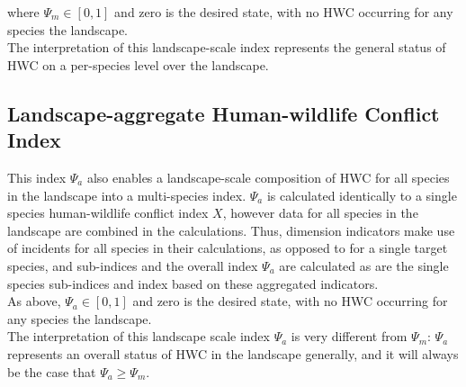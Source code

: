 \documentclass[fleqn,10pt]{olplainarticle}
\begin{document}
where $\Psi_m \in [0,1]$ and zero is the desired state, with no HWC occurring for any species the landscape.\\

The interpretation of this landscape-scale index represents the general status of HWC on a per-species level over the landscape.\\

\subsection*{Landscape-aggregate Human-wildlife Conflict Index}
This index $\Psi_a$ also enables a landscape-scale composition of HWC for all species in the landscape into a multi-species index. $\Psi_a$ is calculated identically to a single species human-wildlife conflict index $X$, however data for all species in the landscape are combined in the calculations. Thus, dimension indicators make use of incidents for all species in their calculations, as opposed to for a single target species, and sub-indices and the overall index $\Psi_a$ are calculated as are the single species sub-indices and index based on these aggregated indicators.\\

As above, $\Psi_a \in [0,1]$ and zero is the desired state, with no HWC occurring for any species the landscape. \\

The interpretation of this landscape scale index $\Psi_a$ is very different from $\Psi_m$: $\Psi_a$ represents an overall status of HWC in the landscape generally, and it will always be the case that $\Psi_a \ge \Psi_m$.\\
\end{document}
